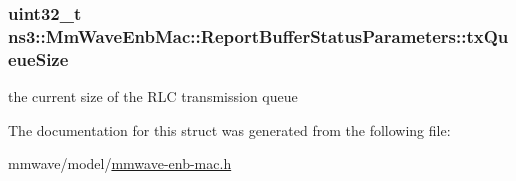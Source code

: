 \subsubsection[{\texorpdfstring{tx\+Queue\+Size}{txQueueSize}}]{\setlength{\rightskip}{0pt plus 5cm}uint32\+\_\+t ns3\+::\+Mm\+Wave\+Enb\+Mac\+::\+Report\+Buffer\+Status\+Parameters\+::tx\+Queue\+Size}\hypertarget{structns3_1_1MmWaveEnbMac_1_1ReportBufferStatusParameters_a6a3de45fcc03ff69ecdb3479053780a1}{}\label{structns3_1_1MmWaveEnbMac_1_1ReportBufferStatusParameters_a6a3de45fcc03ff69ecdb3479053780a1}
the current size of the R\+LC transmission queue 

The documentation for this struct was generated from the following file\+:\begin{DoxyCompactItemize}
\item 
mmwave/model/\hyperlink{mmwave-enb-mac_8h}{mmwave-\/enb-\/mac.\+h}\end{DoxyCompactItemize}
